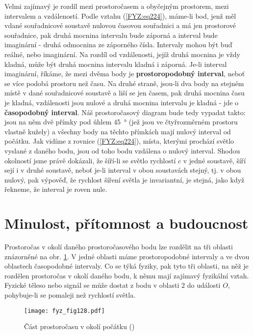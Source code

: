 {    Velmi zajímavý je rozdíl mezi prostoročasem a obyčejným prostorem, mezi intervalem a 
    vzdáleností. Podle vztahu (\ref{FYZ:eq224}), máme-li bod, jenž měl vdané souřadnicové soustavě 
    nulovou časovou souřadnici a má jen prostorové souřadnice, pak druhá mocnina intervalu bude 
    záporná a interval bude imaginární - druhá odmocnina ze záporného čísla. Intervaly mohou být 
    buď reálné, nebo imaginární. Na rozdíl od vzdálenosti, jejíž druhá mocnina je vždy kladná, může 
    být druhá mocnina intervalu kladná i záporná. Je-li interval imaginární, říkáme, že mezi dvěma 
    body je \textbf{prostoropodobný interval}, neboť se více podobá prostoru než času. Na druhé 
    straně, jsou-li dva body na stejném místě v dané souřadnicové soustavě a liší se jen časem, pak 
    druhá mocnina času je kladná, vzdálenosti jsou nulové a druhá mocnina intervalu je kladná - jde 
    o \textbf{časopodobný interval}. Náš prostoročasový diagram bude tedy vypadat takto: jsou na 
    něm dvě přímky pod úhlem \SI{45}{\degree} (jež jsou ve čtyřrozměrném prostoru vlastně kužely) a 
    všechny body na těchto přímkách mají nulový interval od počátku. Jak vidíme z rovnice 
    (\ref{FYZ:eq224}), místa, kterými prochází světlo vyslané z daného bodu, jsou od toho bodu 
    vzdálena o nulový interval. Shodou okolností jsme právě dokázali, že šíří-li se světlo 
    rychlostí \(c\) v jedné soustavě, šíří sejí i v druhé soustavě, neboť je-li interval v obou 
    soustavách stejný, tj. v obou nulový, pak výpověď, že rychlost šíření světla je invariantní, je 
    stejná, jako když řekneme, že interval je roven nule.
    
  \section{Minulost, přítomnost a budoucnost}\label{fyz:IchapXVIIsecIII}
    Prostoročas v okolí daného prostoročasového bodu lze rozdělit na tři oblasti znázorněné na obr. 
    \ref{fyz_fig128}. V jedné oblasti máme prostoropodobné intervaly a ve dvou oblastech 
    časopodobné intervaly. Co se týká fyziky, pak tyto tři oblasti, na něž je rozdělen prostoročas 
    v okolí daného bodu, k němu mají zajímavý fyzikální vztah. Fyzické těleso nebo signál se může 
    dostat z bodu v oblasti \(2\) do události \(O\), pohybuje-li se pomaleji než rychlostí světla.

    \begin{figure}[ht!] %
      \centering
      \texttt{[image: fyz\_fig128.pdf]}
      \caption{Část prostoročasu v okolí počátku
               (\cite[s.~241]{Feynman01})}
      \label{fyz_fig128}
    \end{figure}
    
}
